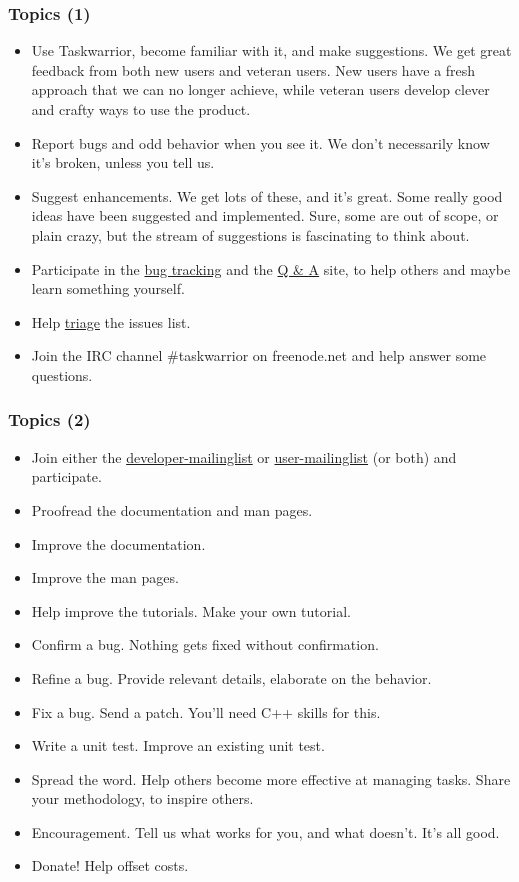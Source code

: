 \documentclass[t,handout]{beamer}
\begin{document}
\begin{frame}[fragile]\frametitle{Topics (1)}
    \begin{itemize}
        \item Use Taskwarrior, become familiar with it, and make suggestions. We get great feedback from both new users and veteran users. New users have a fresh approach that we can no longer achieve, while veteran users develop clever and crafty ways to use the product.
        \item Report bugs and odd behavior when you see it. We don't necessarily know it's broken, unless you tell us.
        \item Suggest enhancements. We get lots of these, and it's great. Some really good ideas have been suggested and implemented. Sure, some are out of scope, or plain crazy, but the stream of suggestions is fascinating to think about.
        \item Participate in the \href{https://bug.tasktools.org}{bug tracking} and the \href{https://answers.tasktools.org}{Q \& A} site, to help others and maybe learn something yourself.
        \item Help \href{https://taskwarrior.org/docs/triage.html}{triage} the issues list.
        \item Join the IRC channel \#taskwarrior on freenode.net and help answer some questions.
    \end{itemize}
\end{frame}

\begin{frame}[fragile]\frametitle{Topics (2)}
    \begin{itemize}
        \item Join either the \href{https://groups.google.com/forum/#!forum/taskwarrior-dev}{developer-mailinglist} or \href{https://groups.google.com/forum/#!forum/taskwarrior-user}{user-mailinglist} (or both) and participate.
        \item Proofread the documentation and man pages.
        \item Improve the documentation.
        \item Improve the man pages.
        \item Help improve the tutorials. Make your own tutorial.
        \item Confirm a bug. Nothing gets fixed without confirmation.
        \item Refine a bug. Provide relevant details, elaborate on the behavior.
        \item Fix a bug. Send a patch. You'll need C++ skills for this.
        \item Write a unit test. Improve an existing unit test.
        \item Spread the word. Help others become more effective at managing tasks. Share your methodology, to inspire others.
        \item Encouragement. Tell us what works for you, and what doesn't. It's all good.
        \item Donate! Help offset costs.
    \end{itemize}
\end{frame}
\end{document}
